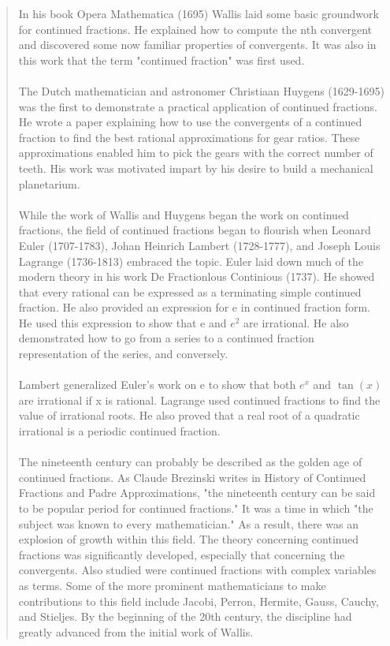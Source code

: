 \documentclass[a4paper]{article}
\begin{document}
    \begin{quote}
    In his book Opera Mathematica (1695) Wallis laid some basic groundwork for continued fractions.
    He explained how to compute the nth convergent and discovered some now familiar properties of convergents.
    It was also in this work that the term "continued fraction" was first used.
    \\
    \\
    The Dutch mathematician and astronomer Christiaan Huygens (1629-1695) was the first to demonstrate a practical application of continued fractions.
    He wrote a paper explaining how to use the convergents of a continued fraction to find the best rational approximations for gear ratios.
    These approximations enabled him to pick the gears with the correct number of teeth.
    His work was motivated impart by his desire to build a mechanical planetarium.
    \\
    \\
    While the work of Wallis and Huygens began the work on continued fractions, the field of continued fractions began to flourish when Leonard Euler (1707-1783), Johan Heinrich Lambert (1728-1777), and Joseph Louis Lagrange (1736-1813) embraced the topic.
    Euler laid down much of the modern theory in his work De Fractionlous Continious (1737).
    He showed that every rational can be expressed as a terminating simple continued fraction.
    He also provided an expression for e in continued fraction form.
    He used this expression to show that e and $e^2$ are irrational.
    He also demonstrated how to go from a series to a continued fraction representation of the series, and conversely.
    \\
    \\
    Lambert generalized Euler's work on e to show that both $e^x$ and $\tan(x)$ are irrational if x is rational.
    Lagrange used continued fractions to find the value of irrational roots.
    He also proved that a real root of a quadratic irrational is a periodic continued fraction.
    \\
    \\
    The nineteenth century can probably be described as the golden age of continued fractions.
    As Claude Brezinski writes in History of Continued Fractions and Padre Approximations, "the nineteenth century can be said to be popular period for continued fractions."
    It was a time in which "the subject was known to every mathematician."
    As a result, there was an explosion of growth within this field.
    The theory concerning continued fractions was significantly developed, especially that concerning the convergents.
    Also studied were continued fractions with complex variables as terms.
    Some of the more prominent mathematicians to make contributions to this field include Jacobi, Perron, Hermite, Gauss, Cauchy, and Stieljes.
    By the beginning of the 20th century, the discipline had greatly advanced from the initial work of Wallis.
    \end{quote}
\end{document}
